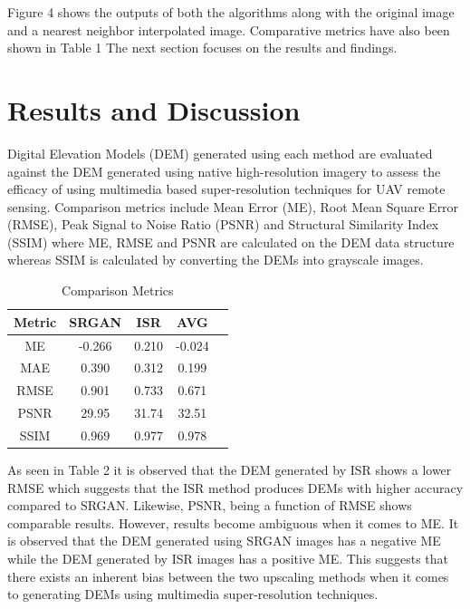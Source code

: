 \documentclass[conference]{IEEEtran}
\begin{document}
Figure 4 shows the outputs of both the algorithms along
with the original image and a nearest neighbor interpolated
image. Comparative metrics have also been shown in Table 1
The next section focuses on the results and findings.

\section{Results and Discussion}

Digital Elevation Models (DEM) generated using each
method are evaluated against the DEM generated using
native high-resolution imagery to assess the efficacy of
using multimedia based super-resolution techniques for
UAV remote sensing. Comparison metrics include Mean
Error (ME), Root Mean Square Error (RMSE), Peak Signal
to Noise Ratio (PSNR) and Structural Similarity Index
(SSIM) where ME, RMSE and PSNR are calculated on the
DEM data structure whereas SSIM is calculated by
converting the DEMs into grayscale images.


\setlength{\tabcolsep}{10pt} %
\renewcommand{\arraystretch}{1.5} %
\begin{table}[h!]
    \caption{Comparison Metrics}
    \centering
     \begin{tabular}{ c c c c c } 
     \hline
     Metric & SRGAN & ISR & AVG \\ [1ex] 
     \hline
     ME & -0.266 & 0.210 & -0.024 \\ 
     MAE & 0.390 & 0.312 & 0.199 \\ 
     RMSE & 0.901 & 0.733 & 0.671 \\
     PSNR & 29.95 & 31.74 & 32.51 \\
     SSIM & 0.969 & 0.977 & 0.978 \\
     \hline
     \end{tabular}
\end{table}

As seen in Table 2 it is observed that the DEM generated by
ISR shows a lower RMSE which suggests that the ISR
method produces DEMs with higher accuracy compared to
SRGAN. Likewise, PSNR, being a function of RMSE
shows comparable results. However, results become
ambiguous when it comes to ME. It is observed that the
DEM generated using SRGAN images has a negative ME
while the DEM generated by ISR images has a positive ME.
This suggests that there exists an inherent bias between the
two upscaling methods when it comes to generating DEMs
using multimedia super-resolution techniques.
\end{document}
